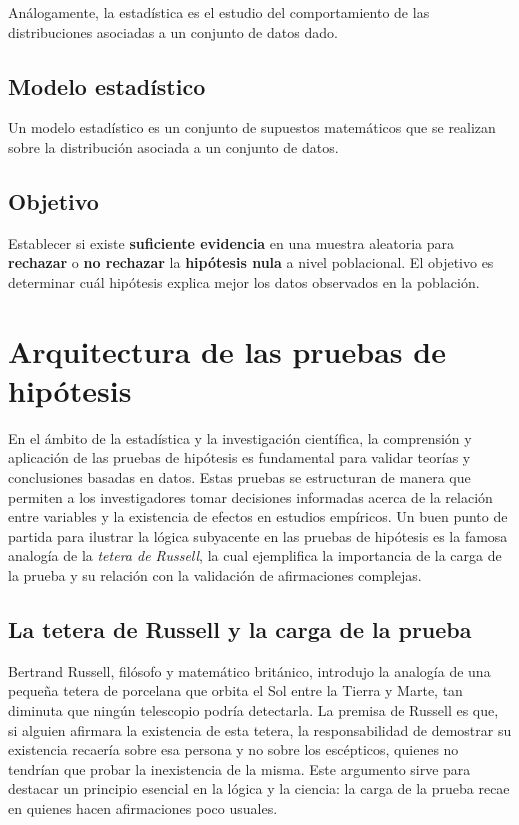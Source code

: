 \documentclass[
  letterpaper,
  DIV=11,
  numbers=noendperiod]{scrreprt}
\begin{document}
Análogamente, la estadística es el estudio del comportamiento de las
distribuciones asociadas a un conjunto de datos dado.

\subsection{Modelo estadístico}\label{modelo-estaduxedstico}

Un modelo estadístico es un conjunto de supuestos matemáticos que se
realizan sobre la distribución asociada a un conjunto de datos.

\subsection{Objetivo}\label{objetivo}

Establecer si existe \textbf{suficiente evidencia} en una muestra
aleatoria para \textbf{rechazar} o \textbf{no rechazar} la
\textbf{hipótesis nula} a nivel poblacional. El objetivo es determinar
cuál hipótesis explica mejor los datos observados en la población.

\section{Arquitectura de las pruebas de
hipótesis}\label{arquitectura-de-las-pruebas-de-hipuxf3tesis}

En el ámbito de la estadística y la investigación científica, la
comprensión y aplicación de las pruebas de hipótesis es fundamental para
validar teorías y conclusiones basadas en datos. Estas pruebas se
estructuran de manera que permiten a los investigadores tomar decisiones
informadas acerca de la relación entre variables y la existencia de
efectos en estudios empíricos. Un buen punto de partida para ilustrar la
lógica subyacente en las pruebas de hipótesis es la famosa analogía de
la \emph{tetera de Russell}, la cual ejemplifica la importancia de la
carga de la prueba y su relación con la validación de afirmaciones
complejas.

\subsection{La tetera de Russell y la carga de la
prueba}\label{la-tetera-de-russell-y-la-carga-de-la-prueba}

Bertrand Russell, filósofo y matemático británico, introdujo la analogía
de una pequeña tetera de porcelana que orbita el Sol entre la Tierra y
Marte, tan diminuta que ningún telescopio podría detectarla. La premisa
de Russell es que, si alguien afirmara la existencia de esta tetera, la
responsabilidad de demostrar su existencia recaería sobre esa persona y
no sobre los escépticos, quienes no tendrían que probar la inexistencia
de la misma. Este argumento sirve para destacar un principio esencial en
la lógica y la ciencia: la carga de la prueba recae en quienes hacen
afirmaciones poco usuales.
\end{document}
